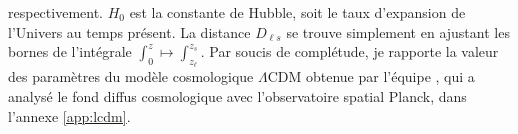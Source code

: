 respectivement. 
$H_0$ est la constante de Hubble, soit le taux 
d'expansion de l'Univers au temps présent. La distance $D_{\ell s}$ se trouve simplement en ajustant les bornes de l'intégrale $\int_0^{z} \mapsto \int_{z_\ell}^{z_s}$.
Par soucis de complétude, 
je rapporte la valeur des paramètres du modèle cosmologique $\Lambda$CDM obtenue par l'équipe \citet{PlanckCollaboration2018}, 
qui a analysé le fond diffus cosmologique avec l'observatoire spatial Planck, dans l'annexe \ref{app:lcdm}.

